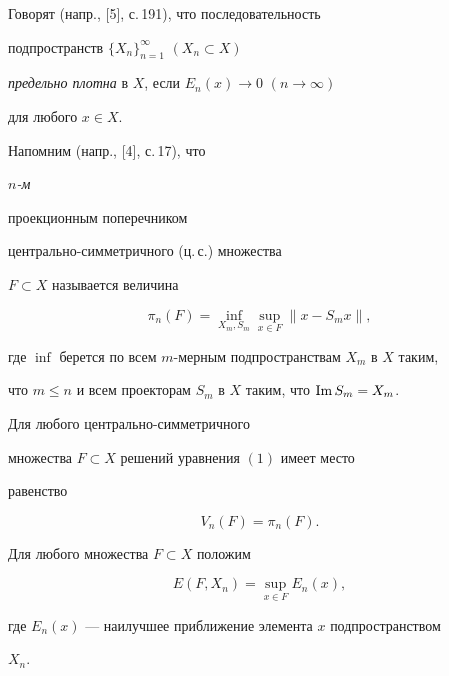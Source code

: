 Говорят (напр., [5], с.\,191), что последовательность


подпространств $\{ X_n\} _{n=1}^{\infty}$ $(X_n\subset X)$


{\it предельно плотна} в $X$, если $E_n(x)\to 0$ $(n\to \infty)$


для любого $x\in X$.





Напомним (напр., [4], с.\,17), что {\it $n$-м


проекционным поперечником} центрально-сим\-мет\-рич\-ного (ц.\,с.) множества


$F\subset X$ называется величина


$$


\pi_n(F) = \inf_{X_m,S_m} \sup_{x \in F} \|x - S_mx\|,


$$


где\; $\inf$\; берется по всем $m$-мерным подпространствам $X_m$ в $X$ таким,


что $m\leq n$ и всем проекторам $S_m$ в $X$ таким, что $\operatorname{Im} S_m = X_m$.





\begin{thm}Для любого центрально-симметричного


множества $F \subset X$ решений уравнения $(1)$ имеет место


равенство


$$


V_n(F) = \pi_n(F).


$$


\end{thm}





Для любого множества $F \subset X$ положим


$$


E(F,X_n)=\sup_{x \in F}E_n(x),


$$


где $E_n(x)$ --- наилучшее приближение элемента $x$ подпространством


$X_n$.





